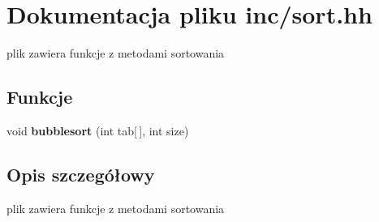\section{Dokumentacja pliku inc/sort.hh}
\label{sort_8hh}


plik zawiera funkcje z metodami sortowania  


\subsection*{Funkcje}
\begin{DoxyCompactItemize}
\item 
void {\bfseries bubblesort} (int tab[$\,$], int size)\label{sort_8hh_ad362c6069fd79ce1dd0ce9c3db15fdd7}

\end{DoxyCompactItemize}


\subsection{Opis szczegółowy}
plik zawiera funkcje z metodami sortowania 

